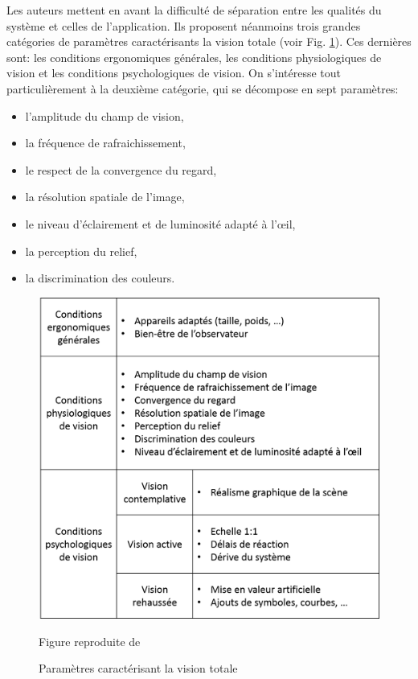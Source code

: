 		\par Les auteurs mettent en avant la difficulté de séparation entre les qualités du système et celles de l'application. Ils proposent néanmoins trois grandes catégories de paramètres caractérisants la vision totale (voir Fig. \ref{fig:burdea_coiffet_tableau}). Ces dernières sont: les conditions ergonomiques générales, les conditions physiologiques de vision et les conditions psychologiques de vision. On s'intéresse tout particulièrement à la deuxième catégorie, qui se décompose en sept paramètres:
		\begin{itemize}
			\item l'amplitude du champ de vision,
			\item la fréquence de rafraichissement,
			\item le respect de la convergence du regard,
			\item la résolution spatiale de l'image,
			\item le niveau d'éclairement et de luminosité adapté à l'œil,
			\item la perception du relief,
			\item la discrimination des couleurs.
		\end{itemize}
		
	\begin{figure}[h]
		\centering
		\includegraphics[scale=.75]{Figures/BurdeaCoiffetTableau}
		\caption{Paramètres caractérisant la vision totale}{Figure reproduite de \citep{burdea_realite_1993}}
		\label{fig:burdea_coiffet_tableau}
	\end{figure}
	
